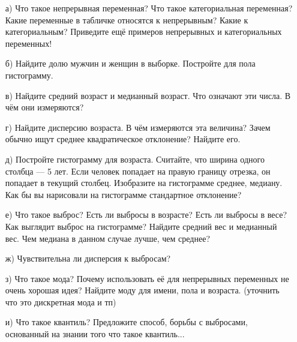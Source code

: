 \documentclass[12pt, a4paper, oneside]{article}
\begin{document}
\begin{enumerate}
	\item[а)] Что такое непрерывная переменная? Что такое категориальная переменная? Какие переменные в табличке относятся к непрерывным? Какие к категориальным?  Приведите ещё примеров непрерывных и категориальных переменных! 
	
	\item[б)]  Найдите долю мужчин и женщин в выборке. Постройте для пола гистограмму. 
	
	\item[в)] Найдите средний возраст и медианный возраст.  Что означают эти числа. В чём они измеряются? 

	\item[г)] Найдите дисперсию возраста. В чём измеряются эта величина? Зачем обычно ищут среднее квадратическое отклонение? Найдите его. 	
	
	\item[д)]  Постройте гистограмму для возраста. Считайте, что ширина одного столбца --- 5 лет. Если человек попадает на правую границу отрезка, он попадает в текущий столбец.  Изобразите на гистограмме среднее, медиану. Как бы вы нарисовали на гистограмме стандартное отклонение? 
	
	\item[е)] Что такое выброс? Есть ли выбросы в возрасте? Есть ли выбросы в весе? Как выглядит выброс на гистограмме? Найдите средний вес и медианный вес. Чем медиана в данном случае лучше, чем среднее?
	
	\item[ж)] Чувствительна ли дисперсия к выбросам?
	
	\item[з)] Что такое мода? Почему использовать её для непрерывных переменных не очень хорошая идея? Найдите моду для имени, пола и возраста.  (уточнить что это дискретная мода и тп) 
	
	\item[и)]  Что такое квантиль? Предложите способ,  борьбы с выбросами, основанный на знании того что такое квантиль... 
\end{enumerate}
\end{document}

